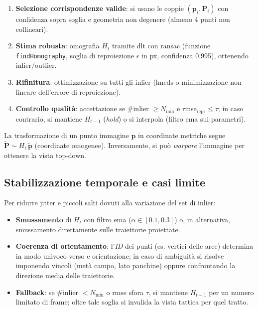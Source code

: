 \documentclass[12pt,a4paper,openright,twoside]{book}
\begin{document}
\begin{enumerate}
  \item \textbf{Selezione corrispondenze valide}:
  si usano le coppie $(\mathbf{p}_i,\mathbf{P}_i)$ con confidenza sopra soglia
  e geometria non degenere (almeno 4 punti non collineari).
  \item \textbf{Stima robusta}:
  omografia $H_t$ tramite \ac{dlt} con \ac{ransac}
  (funzione \texttt{findHomography}, soglia di reproiezione $\epsilon$ in px,
  confidenza 0.995), ottenendo inlier/outlier.
  \item \textbf{Rifinitura}:
  ottimizzazione su tutti gli inlier (\ac{lmeds} o minimizzazione non lineare dell'errore di reproiezione).
  \item \textbf{Controllo qualità}:
  accettazione se \#inlier $\geq N_{\min}$ e \ac{rmse}$_\mathrm{repr}\leq\tau$; in caso contrario,
  si mantiene $H_{t-1}$ (\emph{hold}) o si interpola (filtro \ac{ema} sui parametri).
\end{enumerate}

La trasformazione di un punto immagine $\mathbf{p}$ in coordinate metriche
segue $\tilde{\mathbf{P}} \sim H_t\,\tilde{\mathbf{p}}$ (coordinate omogenee).
Inversamente, si può \emph{warpare} l'immagine per ottenere la vista top-down.

\subsection{Stabilizzazione temporale e casi limite}
\label{subsec:stabilization}

Per ridurre jitter e piccoli salti dovuti alla variazione del set di inlier:
\begin{itemize}
  \item \textbf{Smussamento} di $H_t$ con filtro \ac{ema} ($\alpha\in[0.1,0.3]$) o,
  in alternativa, smussamento direttamente sulle traiettorie proiettate.
  \item \textbf{Coerenza di orientamento}:
  l'\emph{ID} dei punti (es. vertici delle aree) determina in modo univoco verso
  e orientazione; in caso di ambiguità si risolve imponendo vincoli (metà campo,
  lato panchine) oppure confrontando la direzione media delle traiettorie.
  \item \textbf{Fallback}:
  se \#inlier $<N_{\min}$ o \ac{rmse} sfora $\tau$, si mantiene $H_{t-1}$ per un numero
  limitato di frame; oltre tale soglia si invalida la vista tattica per quel tratto.
\end{itemize}
\end{document}
